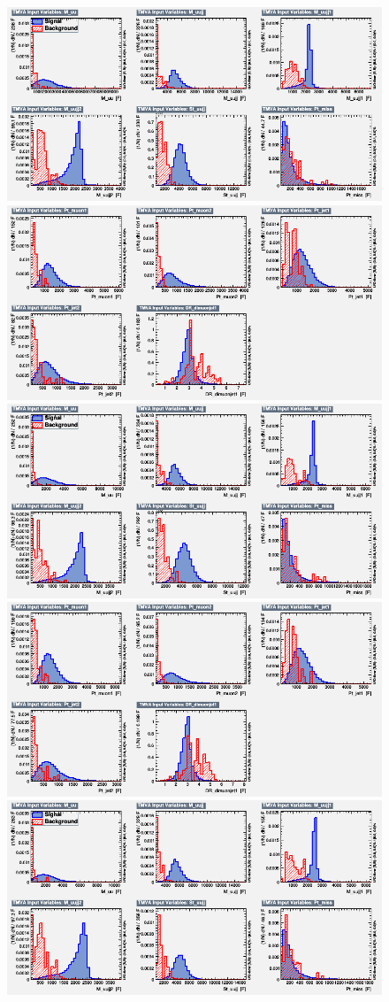 \begin{figure}[H]
    \centering
    {\includegraphics[width=.49\textwidth]{Images/Analysis/Results_LQToBMu_pair_uubj_BDTG_FullRun2_2023_01_25_020318/2300/variables_id_c1.png}}
    {\includegraphics[width=.49\textwidth]{Images/Analysis/Results_LQToBMu_pair_uubj_BDTG_FullRun2_2023_01_25_020318/2300/variables_id_c2.png}}
    {\includegraphics[width=.49\textwidth]{Images/Analysis/Results_LQToBMu_pair_uubj_BDTG_FullRun2_2023_01_25_020318/2400/variables_id_c1.png}}
    {\includegraphics[width=.49\textwidth]{Images/Analysis/Results_LQToBMu_pair_uubj_BDTG_FullRun2_2023_01_25_020318/2400/variables_id_c2.png}}
    {\includegraphics[width=.49\textwidth]{Images/Analysis/Results_LQToBMu_pair_uubj_BDTG_FullRun2_2023_01_25_020318/2500/variables_id_c1.png}}

\end{figure}
